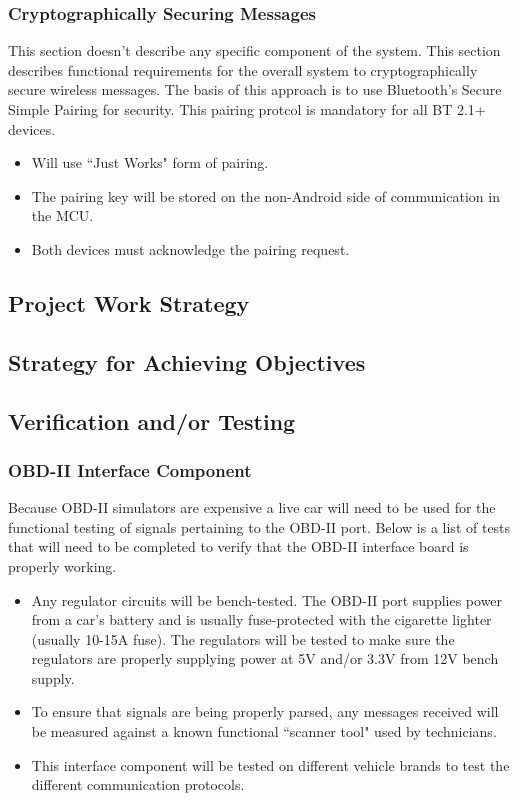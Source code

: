 \documentclass[12pt,letterpaper]{article}
\begin{document}
\subsubsection{Cryptographically Securing Messages}
This section doesn't describe any specific component of the system. This section describes functional requirements for the overall system to cryptographically secure wireless messages. The basis of this approach is to use Bluetooth's Secure Simple Pairing for security. This pairing protcol is mandatory for all BT 2.1+ devices.

\begin{itemize}
	\item Will use ``Just Works" form of pairing.
	\item The pairing key will be stored on the non-Android side of communication in the MCU.
	\item Both devices must acknowledge the pairing request.
\end{itemize}

\subsection{Project Work Strategy}


\subsection{Strategy for Achieving Objectives}

\subsection{Verification and/or Testing}
\subsubsection{OBD-II Interface Component}
Because OBD-II simulators are expensive a live car will need to be used for the functional testing of signals pertaining to the OBD-II port. Below is a list of tests that will need to be completed to verify that the OBD-II interface board is properly working.

\begin{itemize}
\item Any regulator circuits will be bench-tested. The OBD-II port supplies power from a car's battery and is usually fuse-protected with the cigarette lighter (usually 10-15A fuse). The regulators will be tested to make sure the regulators are properly supplying power at 5V and/or 3.3V from 12V bench supply.
\item To ensure that signals are being properly parsed, any messages received will be measured against a known functional ``scanner tool" used by technicians.
\item This interface component will be tested on different vehicle brands to test the different communication protocols.
\end{itemize}
\end{document}
